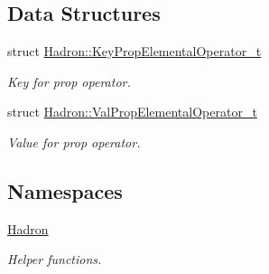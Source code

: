 \subsection*{Data Structures}
\begin{DoxyCompactItemize}
\item 
struct \mbox{\hyperlink{structHadron_1_1KeyPropElementalOperator__t}{Hadron\+::\+Key\+Prop\+Elemental\+Operator\+\_\+t}}
\begin{DoxyCompactList}\small\item\em Key for prop operator. \end{DoxyCompactList}\item 
struct \mbox{\hyperlink{structHadron_1_1ValPropElementalOperator__t}{Hadron\+::\+Val\+Prop\+Elemental\+Operator\+\_\+t}}
\begin{DoxyCompactList}\small\item\em Value for prop operator. \end{DoxyCompactList}\end{DoxyCompactItemize}
\subsection*{Namespaces}
\begin{DoxyCompactItemize}
\item 
 \mbox{\hyperlink{namespaceHadron}{Hadron}}
\begin{DoxyCompactList}\small\item\em Helper functions. \end{DoxyCompactList}\end{DoxyCompactItemize}
